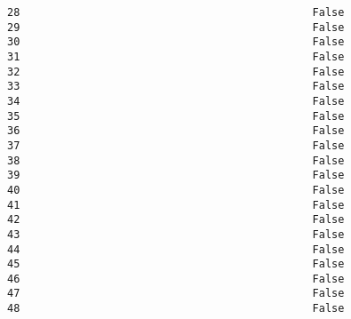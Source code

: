 \documentclass[11pt]{article}
\begin{document}
\begin{Verbatim}[commandchars=\\\{\}]
28                                              False                                     
29                                              False                                     
30                                              False                                     
31                                              False                                     
32                                              False                                     
33                                              False                                     
34                                              False                                     
35                                              False                                     
36                                              False                                     
37                                              False                                     
38                                              False                                     
39                                              False                                     
40                                              False                                     
41                                              False                                     
42                                              False                                     
43                                              False                                     
44                                              False                                     
45                                              False                                     
46                                              False                                     
47                                              False                                     
48                                              False                                     


\end{Verbatim}
\end{document}
